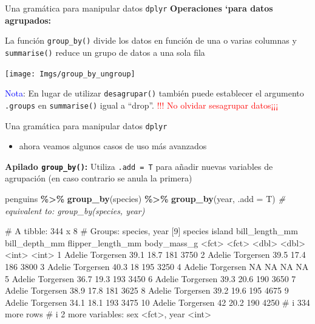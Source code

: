 \documentclass[
  ignorenonframetext,
  aspectratio=169]{beamer}
\newenvironment{Shaded}{\begin{snugshade}}{\end{snugshade}}
\newcommand{\AttributeTok}[1]{\textcolor[rgb]{0.13,0.29,0.53}{#1}}
\newcommand{\CommentTok}[1]{\textcolor[rgb]{0.56,0.35,0.01}{\textit{#1}}}
\newcommand{\FunctionTok}[1]{\textcolor[rgb]{0.13,0.29,0.53}{\textbf{#1}}}
\newcommand{\NormalTok}[1]{#1}
\newcommand{\SpecialCharTok}[1]{\textcolor[rgb]{0.81,0.36,0.00}{\textbf{#1}}}
\providecommand{\tightlist}{%
  \setlength{\itemsep}{0pt}\setlength{\parskip}{0pt}}
\let\oldverbatim\verbatim
\let\endoldverbatim\endverbatim
\renewenvironment{verbatim}{\tiny\oldverbatim}{\endoldverbatim}
\newcommand\blue[1]{\textcolor{blue}{#1}}
\newcommand\red[1]{\textcolor{red}{#1}}
\begin{document}
\begin{frame}[fragile]{Una gramática para manipular datos
\texttt{dplyr}}
\label{una-gramuxe1tica-para-manipular-datos-dplyr-7}
\textbf{Operaciones `para datos agrupados:}

La función \texttt{group\_by()} divide los datos en función de una o
varias columnas y \texttt{summarise()} reduce un grupo de datos a una
sola fila

\begin{center}\texttt{[image: Imgs/group\_by\_ungroup]} \end{center}

\blue{Nota}: En lugar de utilizar \texttt{desagrupar()} también puede
establecer el argumento \texttt{.groups} en \texttt{summarise()} igual a
``drop''. \red{!!! No olvidar sesagrupar datos¡¡¡}
\end{frame}

\begin{frame}[fragile]{Una gramática para manipular datos
\texttt{dplyr}}
\label{una-gramuxe1tica-para-manipular-datos-dplyr-8}
\begin{itemize}
\tightlist
\item
  ahora veamos algunos casos de uso más avanzados
\end{itemize}

\textbf{Apilado \texttt{group\_by()}:} Utiliza \texttt{.add\ =\ T} para
añadir nuevas variables de agrupación (en caso contrario se anula la
primera)

\begin{Shaded}
\begin{Highlighting}[]
\NormalTok{penguins }\SpecialCharTok{\%\textgreater{}\%} 
  \FunctionTok{group\_by}\NormalTok{(species) }\SpecialCharTok{\%\textgreater{}\%} 
  \FunctionTok{group\_by}\NormalTok{(year, }\AttributeTok{.add =}\NormalTok{ T)   }\CommentTok{\# equivalent to: group\_by(species, year)}
\end{Highlighting}
\end{Shaded}

\begin{verbatim}
# A tibble: 344 x 8
# Groups:   species, year [9]
   species island    bill_length_mm bill_depth_mm flipper_length_mm body_mass_g
   <fct>   <fct>              <dbl>         <dbl>             <int>       <int>
 1 Adelie  Torgersen           39.1          18.7               181        3750
 2 Adelie  Torgersen           39.5          17.4               186        3800
 3 Adelie  Torgersen           40.3          18                 195        3250
 4 Adelie  Torgersen           NA            NA                  NA          NA
 5 Adelie  Torgersen           36.7          19.3               193        3450
 6 Adelie  Torgersen           39.3          20.6               190        3650
 7 Adelie  Torgersen           38.9          17.8               181        3625
 8 Adelie  Torgersen           39.2          19.6               195        4675
 9 Adelie  Torgersen           34.1          18.1               193        3475
10 Adelie  Torgersen           42            20.2               190        4250
# i 334 more rows
# i 2 more variables: sex <fct>, year <int>
\end{verbatim}
\end{frame}
\end{document}
